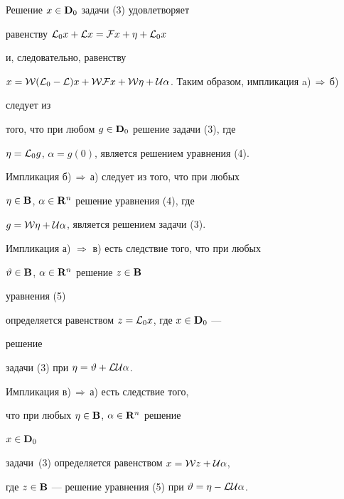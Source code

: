\begin{pf}


Решение $x\in\bold {D}_0$ задачи (3) удовлетворяет


равенству ${\cal L}_0x+{\cal L}x={\cal F}x+\eta+{\cal L}_0x$


и, следовательно, равенству


$x={\cal W}({\cal L}_0-{\cal L})x+{\cal W}{\cal F}x+{\cal W}\eta+


{\cal U}\alpha$. Таким образом, импликация a)\,$\Longrightarrow$\,б)


следует из


того, что при любом $g\in\bold {D}_0$ решение задачи (3), где


$\eta={\cal L}_0g$, $\alpha=g(0)$, является решением уравнения (4).


Импликация б)\,$\Longrightarrow$\,а) следует из того, что при любых


$\eta\in\bold {B}$, $\alpha\in\bold {R}^n$ решение уравнения (4), где


$g={\cal W}\eta+{\cal U}\alpha$, является решением задачи (3).





Импликация а) $\Longrightarrow$ в) есть следствие того, что при любых


$\vartheta\in\bold {B}$, $\alpha\in\bold {R}^n$ решение $z\in\bold {B}$


уравнения (5)


определяется равенством $z={\cal L}_0x$, где $x\in\bold {D}_0$ ---


решение


задачи (3) при $\eta=\vartheta+{\cal L}{\cal U}\alpha$.


Импликация в)\,$\Longrightarrow$\,а) есть следствие того,


что при любых $\eta\in\bold {B}$, $\alpha\in\bold {R}^n$ решение


$x\in\bold {D}_0$


задачи~(3) определяется равенством $x={\cal W}z+{\cal U}\alpha$,


где $z\in\spc{B}$ --- решение уравнения (5) при $\vartheta=


\eta-{\cal L}{\cal U}\alpha$.


\end{pf}





